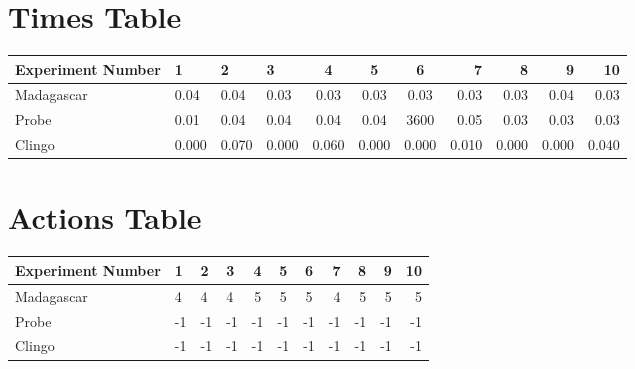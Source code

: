 \documentclass[8pt]{article}
\begin{document}
\begin{landscape}
\section{Times Table}\begin{tabular}{ | l | l | l | l | c | c | c | r | r | r | r | }\hline
Experiment Number & 1 & 2 & 3 & 4 & 5 & 6 & 7 & 8 & 9 & 10\\  \hline
Madagascar & 0.04 & 0.04 & 0.03 & 0.03 & 0.03 & 0.03 & 0.03 & 0.03 & 0.04 & 0.03\\  \hline
Probe & 0.01 & 0.04 & 0.04 & 0.04 & 0.04 & 3600 & 0.05 & 0.03 & 0.03 & 0.03\\  \hline
Clingo & 0.000 & 0.070 & 0.000 & 0.060 & 0.000 & 0.000 & 0.010 & 0.000 & 0.000 & 0.040\\ \hline
\end{tabular}
\section{Actions Table}\begin{tabular}{ | l | l | l | l | c | c | c | r | r | r | r | }\hline
Experiment Number & 1 & 2 & 3 & 4 & 5 & 6 & 7 & 8 & 9 & 10\\ \hline
 Madagascar & 4 & 4 & 4 & 5 & 5 & 5 & 4 & 5 & 5 & 5\\ \hline
 Probe & -1 & -1 & -1 & -1 & -1 & -1 & -1 & -1 & -1 & -1\\ \hline
 Clingo & -1 & -1 & -1 & -1 & -1 & -1 & -1 & -1 & -1 & -1\\ \hline
\end{tabular}
\end{landscape}
\end{document}
